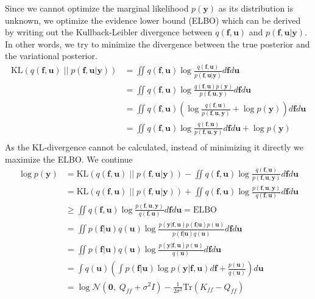 \documentclass[5p,11pt]{article}
\begin{document}
Since we cannot optimize the marginal likelihood $p(\bm{y})$ as its distribution is unknown, we optimize the evidence lower bound (ELBO) which can be derived by writing out the Kullback-Leibler divergence between $q(\bm{f},\bm{u})$ and $p(\bm{f},\bm{u}|\bm{y})$. In other words, we try to minimize the divergence between the true posterior and the variational posterior.
\begin{equation}
    \begin{aligned}
\mathrm{KL}(q(\bm{f},\bm{u})\;||\;p(\bm{f},\bm{u}|\bm{y})) &= \iint q(\bm{f},\bm{u}) \log \frac{q(\bm{f},\bm{u})}{p(\bm{f},\bm{u}|\bm{y})} d\bm{f} d\bm{u}\\
&= \iint q(\bm{f},\bm{u}) \log \frac{q(\bm{f},\bm{u})p(\bm{y})}{p(\bm{f},\bm{u},\bm{y})} d\bm{f} d\bm{u}\\
&= \iint q(\bm{f},\bm{u}) \left( \log \frac{q(\bm{f},\bm{u})}{p(\bm{f},\bm{u},\bm{y})} + \log p(\bm{y})\right) d\bm{f} d\bm{u}\\
&= \iint q(\bm{f},\bm{u}) \log \frac{q(\bm{f},\bm{u})}{p(\bm{f},\bm{u},\bm{y})} d\bm{f} d\bm{u} + \log p(\bm{y})\\
    \end{aligned}
\end{equation}
As the KL-divergence cannot be calculated, instead of minimizing it directly we maximize the ELBO. We continue
\begin{equation}
    \begin{aligned}
\log p(\bm{y}) &= \mathrm{KL}(q(\bm{f},\bm{u})\;||\;p(\bm{f},\bm{u}|\bm{y})) - \iint q(\bm{f},\bm{u}) \log \frac{q(\bm{f},\bm{u})}{p(\bm{f},\bm{u},\bm{y})} d\bm{f} d\bm{u}\\
&= \mathrm{KL}(q(\bm{f},\bm{u})\;||\;p(\bm{f},\bm{u}|\bm{y})) + \iint q(\bm{f},\bm{u}) \log \frac{p(\bm{f},\bm{u},\bm{y})}{q(\bm{f},\bm{u})} d\bm{f} d\bm{u}\\
&\geq \iint q(\bm{f},\bm{u}) \log \frac{p(\bm{f},\bm{u},\bm{y})}{q(\bm{f},\bm{u})} d\bm{f} d\bm{u} = \mathrm{ELBO}\\
    &= \iint p(\bm{f}|\bm{u}) q(\bm{u}) \log \frac{p(\bm{y}|\bm{f},\bm{u})p(\bm{f}|\bm{u})p(\bm{u})}{p(\bm{f}|\bm{u}) q(\bm{u})} d\bm{f} d\bm{u}\\
    &= \iint p(\bm{f}|\bm{u}) q(\bm{u}) \log \frac{p(\bm{y}|\bm{f},\bm{u})p(\bm{u})}{q(\bm{u})} d\bm{f} d\bm{u}\\
    &= \int q(\bm{u}) \left( \int p(\bm{f}|\bm{u}) \log p(\bm{y}|\bm{f},\bm{u}) d\bm{f} + \frac{p(\bm{u})}{q(\bm{u})} \right) d\bm{u}\\
    &= \log \mathcal{N}(\bm{0},\; Q_{ff}+\sigma^2I) - \frac{1}{2\sigma^2}\mathrm{Tr}(K_{ff} - Q_{ff})\\
    \end{aligned}
\end{equation}
\end{document}
